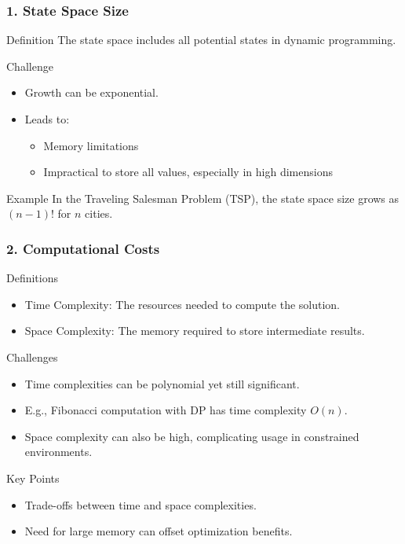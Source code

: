 \documentclass[aspectratio=169]{beamer}
\begin{document}
\begin{frame}[fragile]
    \frametitle{1. State Space Size}
    \begin{block}{Definition}
        The state space includes all potential states in dynamic programming.
    \end{block}
    
    \begin{block}{Challenge}
        \begin{itemize}
            \item Growth can be exponential.
            \item Leads to:
            \begin{itemize}
                \item Memory limitations
                \item Impractical to store all values, especially in high dimensions
            \end{itemize}
        \end{itemize}
    \end{block}

    \begin{block}{Example}
        In the Traveling Salesman Problem (TSP), the state space size grows as $(n-1)!$ for $n$ cities.
    \end{block}
\end{frame}

\begin{frame}[fragile]
    \frametitle{2. Computational Costs}
    \begin{block}{Definitions}
        \begin{itemize}
            \item Time Complexity: The resources needed to compute the solution.
            \item Space Complexity: The memory required to store intermediate results.
        \end{itemize}
    \end{block}

    \begin{block}{Challenges}
        \begin{itemize}
            \item Time complexities can be polynomial yet still significant.
            \item E.g., Fibonacci computation with DP has time complexity $O(n)$.
            \item Space complexity can also be high, complicating usage in constrained environments.
        \end{itemize}
    \end{block}
    
    \begin{block}{Key Points}
        \begin{itemize}
            \item Trade-offs between time and space complexities.
            \item Need for large memory can offset optimization benefits.
        \end{itemize}
    \end{block}
\end{frame}
\end{document}
